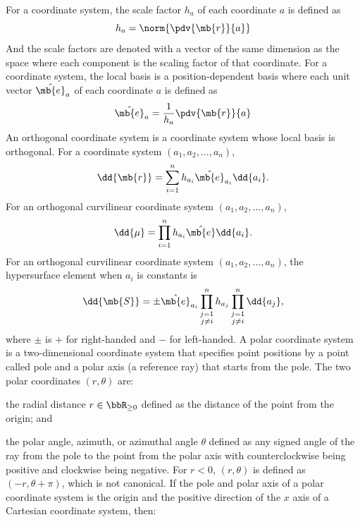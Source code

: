 For a coordinate system, the scale factor $h_a$ of each coordinate $a$ is defined as
\[h_a=\norm{\pdv{\mb{r}}{a}}\]
And the scale factors are denoted with a vector of the same dimension as the space where each component is the scaling factor of that coordinate.
For a coordinate system, the local basis is a position-dependent basis where each unit vector $\hat{\mb{e}}_a$ of each coordinate $a$ is defined as
\[\hat{\mb{e}}_a=\frac{1}{h_a}\pdv{\mb{r}}{a}\]
An orthogonal coordinate system is a coordinate system whose local basis is orthogonal.
For a coordinate system $(a_1,a_2,\ldots,a_n)$,
\[\dd{\mb{r}}=\sum_{i=1}^nh_{a_i}\hat{\mb{e}}_{a_i}\dd{a_i}.\]
For an orthogonal curvilinear coordinate system $(a_1,a_2,\ldots,a_n)$,
\[\dd{\mu}=\prod_{i=1}^nh_{a_i}\hat{\mb{e}}\dd{a_i}.\]
For an orthogonal curvilinear coordinate system $(a_1,a_2,\ldots,a_n)$, the hypersurface element when $a_i$ is constants is
\[\dd{\mb{S}}=\pm\hat{\mb{e}}_{a_i}\prod_{\substack{j=1\\j\neq i}}^nh_{a_j}\prod_{\substack{j=1\\j\neq i}}^n\dd{a_j},\]
where $\pm$ is $+$ for right-handed and $-$ for left-handed.
A polar coordinate system is a two-dimensional coordinate system that specifies point positions by a point called pole and a polar axis (a reference ray) that starts from the pole. The two polar coordinates $(r,\theta)$ are:
\bit
\item the radial distance $r\in\bbR_{\geq 0}$ defined as the distance of the point from the origin; and
\item the polar angle, azimuth, or azimuthal angle $\theta$ defined as any signed angle of the ray from the pole to the point from the polar axis with counterclockwise being positive and clockwise being negative.
\eit
For $r<0$, $(r,\theta)$ is defined as $(-r,\theta+\pi)$, which is not canonical.
If the pole and polar axis of a polar coordinate system is the origin and the positive direction of the $x$ axis of a Cartesian coordinate system, then:

